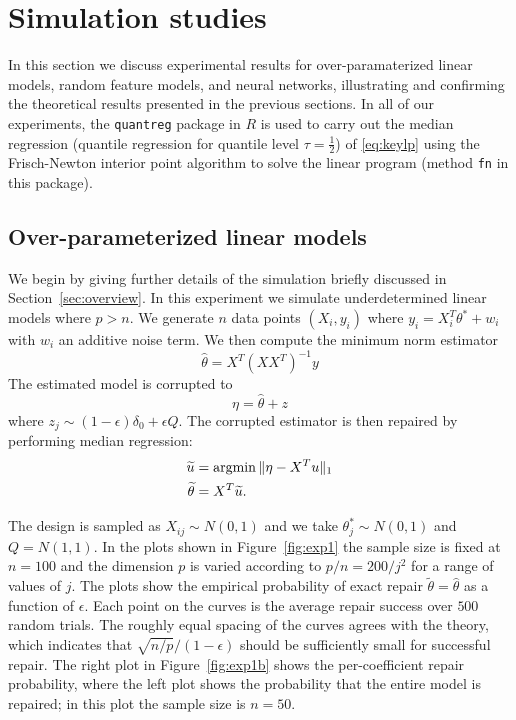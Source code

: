 
\section{Simulation studies}
\label{sec:experiments}

In this section we discuss experimental results for over-paramaterized linear models, random feature models, and neural networks, illustrating and confirming the theoretical results presented in the previous sections.
In all of our experiments, the \texttt{quantreg} package in $R$ is used to carry out the median regression (quantile regression for quantile level $\tau = \frac{1}{2}$) of \eqref{eq:keylp} using the Frisch-Newton interior point algorithm to solve the linear program (method \texttt{fn} in this package).


\subsection{Over-parameterized linear models}


We begin by giving further details of the simulation briefly discussed
in Section~\ref{sec:overview}. In this experiment we simulate underdetermined linear models where $p > n$.
We generate $n$ data points $(X_i, y_i)$ where
$y_i = X_i^T \theta^* + w_i$ with $w_i$ an additive noise term. We then compute the minimum norm estimator
\begin{equation}
  \hat\theta = X^T (X X^T)^{-1} y
\end{equation}
The estimated model is corrupted to
\begin{equation}
  \eta = \hat\theta + z
\end{equation}
where $z_j \sim (1-\epsilon) \delta_0 +\epsilon Q$. The corrupted estimator is then repaired by performing median regression:
\begin{align}
  \tilde u &= \argmin \|\eta - X^T u\|_1 \\
  \tilde \theta &= X^T \tilde u.
\end{align}

The design is sampled as $X_{ij} \sim N(0,1)$ and we take $\theta_j^* \sim N(0,1)$ and $Q = N(1,1)$. In the plots shown
in Figure~\ref{fig:exp1} the sample size is fixed at $n=100$ and the dimension $p$ is varied according to $p/n=200/j^2$
for a range of values of $j$. The plots show the empirical probability of exact repair $\tilde\theta = \hat\theta$ as a function of $\epsilon$. Each point on the curves is the average repair success over $500$ random trials.
The roughly equal spacing of the curves agrees with the theory, which indicates that $\sqrt{n/p}/(1-\epsilon)$ should be sufficiently small for successful repair. The right plot in Figure~\ref{fig:exp1b} shows the per-coefficient repair probability, where the left plot shows the probability that the entire model is repaired; in this plot the sample size is $n=50$.

